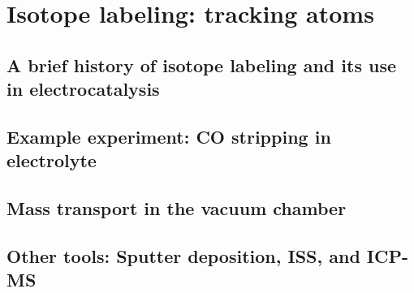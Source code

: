\section{Isotope labeling: tracking atoms}

\subsection{A brief history of isotope labeling and its use in electrocatalysis}

\subsection{Example experiment: CO stripping in  electrolyte}\label{subsec:isotope_CO2}

\subsection{Mass transport in the vacuum chamber}\label{subsec:vacuum_transport}

\subsection{Other tools: Sputter deposition, ISS, and ICP-MS}\label{subsec:other_tools}
